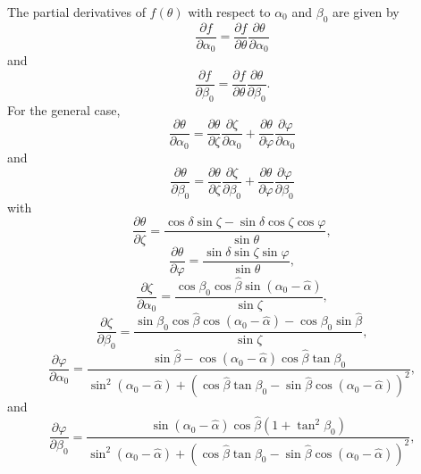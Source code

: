 \documentclass{article}[12pt,a4]
\begin{document}
The partial derivatives of $f(\theta)$ with respect to $\alpha_0$ and $\beta_0$ are given by
\begin{equation}
\frac{\partial f}{\partial \alpha_0} = \frac{\partial f}{\partial \theta} \frac{\partial \theta}{\partial \alpha_0}
\end{equation}
and
\begin{equation}
\frac{\partial f}{\partial \beta_0} = \frac{\partial f}{\partial \theta} \frac{\partial \theta}{\partial \beta_0}.
\end{equation}
For the general case,
\begin{equation}
\frac{\partial \theta}{\partial \alpha_0} = 
\frac{\partial \theta}{\partial \zeta} \frac{\partial \zeta}{\partial \alpha_0} +
\frac{\partial \theta}{\partial \varphi} \frac{\partial \varphi}{\partial \alpha_0}
\end{equation}
and
\begin{equation}
\frac{\partial \theta}{\partial \beta_0} =
\frac{\partial \theta}{\partial \zeta} \frac{\partial \zeta}{\partial \beta_0} +
\frac{\partial \theta}{\partial \varphi} \frac{\partial \varphi}{\partial \beta_0}
\end{equation}
with
\begin{equation}
\frac{\partial \theta}{\partial \zeta} = \frac{\cos \delta \sin \zeta - \sin \delta \cos \zeta \cos \varphi}{\sin \theta} ,
\end{equation}
\begin{equation}
\frac{\partial \theta}{\partial \varphi} = \frac{\sin \delta \sin \zeta \sin \varphi}{\sin \theta} ,
\end{equation}
\begin{equation}
\frac{\partial \zeta}{\partial \alpha_0}  = \frac{\cos \beta_0 \cos \hat{\beta} \sin(\alpha_0-\hat{\alpha})}{\sin \zeta} ,
\end{equation}
\begin{equation}
\frac{\partial \zeta}{\partial \beta_0}  = \frac{\sin \beta_0 \cos \hat{\beta} \cos(\alpha_0-\hat{\alpha}) - \cos \beta_0 \sin \hat{\beta}}{\sin \zeta} ,
\end{equation}
\begin{equation}
\frac{\partial \varphi}{\partial \alpha_0}  = \frac
{\sin \hat{\beta} - \cos(\alpha_0-\hat{\alpha}) \cos \hat{\beta} \tan \beta_0}
{\sin^2(\alpha_0-\hat{\alpha}) + (\cos \hat{\beta} \tan \beta_0 - \sin \hat{\beta} \cos(\alpha_0-\hat{\alpha}))^2} ,
\end{equation}
and
\begin{equation}
\frac{\partial \varphi}{\partial \beta_0}  = \frac
{\sin(\alpha_0-\hat{\alpha}) \cos \hat{\beta} (1 + \tan^2 \beta_0)}
{\sin^2(\alpha_0-\hat{\alpha}) + (\cos \hat{\beta} \tan \beta_0 - \sin \hat{\beta} \cos(\alpha_0-\hat{\alpha}))^2} ,
\end{equation}
\end{document}
